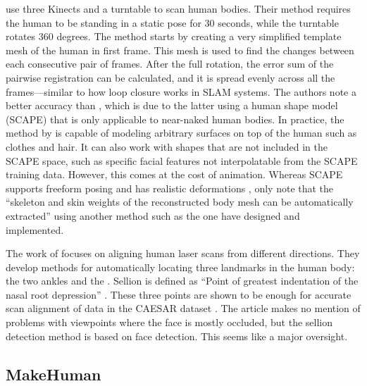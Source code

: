 \citet{tongscanning} use three Kinects and a turntable to scan human bodies. Their method requires the human to be standing in a static pose for 30 seconds, while the turntable rotates 360 degrees. The method starts by creating a very simplified template mesh of the human in first frame. This mesh is used to find the changes between each consecutive pair of frames. After the full rotation, the error sum of the pairwise registration can be calculated, and it is spread evenly across all the frames---similar to how loop closure works in SLAM systems. The authors note a better accuracy than \citep{weiss2011home}, which is due to the latter using a human shape model (SCAPE) that is only applicable to near-naked human bodies. In practice, the method by \citeauthor{tongscanning} is capable of modeling arbitrary surfaces on top of the human such as clothes and hair. It can also work with shapes that are not included in the SCAPE space, such as specific facial features not interpolatable from the SCAPE training data. However, this comes at the cost of animation. Whereas SCAPE supports freeform posing and has realistic deformations \citep{anguelov2005scape}, \citet{tongscanning} only note that the ``skeleton and skin weights of the reconstructed body mesh can be automatically extracted'' using another method such as the one \citet{baran2007automatic} have designed and implemented.

\newtopic

The work of \citet{hirshbergc2011evaluating} focuses on aligning human laser scans from different directions. They develop methods for automatically locating three landmarks in the human body: the two ankles and the . Sellion is defined as ``Point of greatest indentation of the nasal root depression'' \citep{blackwell2002civilian}. These three points are shown to be enough for accurate scan alignment of data in the CAESAR dataset \citep{robinette2002civilian}. The article makes no mention of problems with viewpoints where the face is mostly occluded, but the sellion detection method is based on face detection. This seems like a major oversight.



\subsection{MakeHuman} \label{literature.makehuman}

